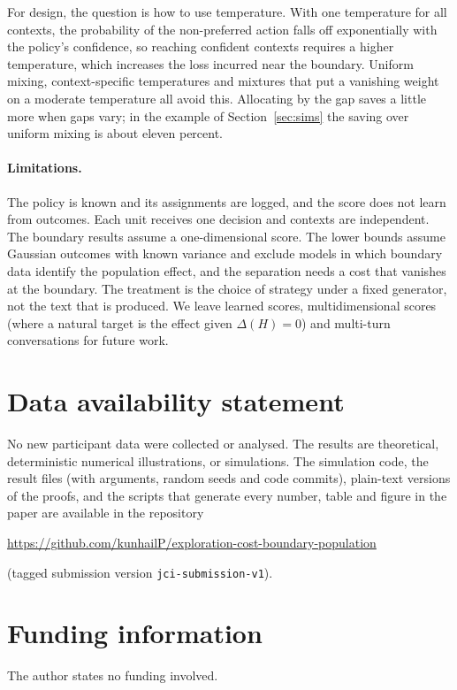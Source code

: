 \documentclass[12pt]{article}
\theoremstyle{definition}
\theoremstyle{remark}
\begin{document}
For design, the question is how to use temperature. With one temperature for all
contexts, the probability of the non-preferred action falls off exponentially with the
policy's confidence, so reaching confident contexts requires a higher temperature,
which increases the loss incurred near the boundary. Uniform mixing, context-specific temperatures and
mixtures that put a vanishing weight on a moderate temperature all avoid this.
Allocating by the gap saves a little more when gaps vary; in the example of
Section~\ref{sec:sims} the saving over uniform mixing is about eleven percent.

\paragraph{Limitations.} The policy is known and its assignments are logged, and the
score does not learn from outcomes. Each unit receives one decision and contexts are
independent. The boundary results assume a one-dimensional score. The lower bounds
assume Gaussian outcomes with known variance and exclude models in which boundary
data identify the population effect, and the separation needs a cost that vanishes at
the boundary. The treatment is the choice of strategy under a fixed generator, not the
text that is produced. We leave learned scores, multidimensional scores (where a
natural target is the effect given $\Delta(H)=0$) and multi-turn conversations for
future work.


\section*{Data availability statement}
No new participant data were collected or analysed. The results are theoretical,
deterministic numerical illustrations, or simulations. The simulation code, the
result files (with arguments, random seeds and code commits), plain-text versions of
the proofs, and the scripts that generate every number, table and figure in the paper
are available in the repository
\begin{center}\url{https://github.com/kunhailP/exploration-cost-boundary-population}\end{center}
(tagged submission version \texttt{jci-submission-v1}).

\section*{Funding information}
The author states no funding involved.
\end{document}
